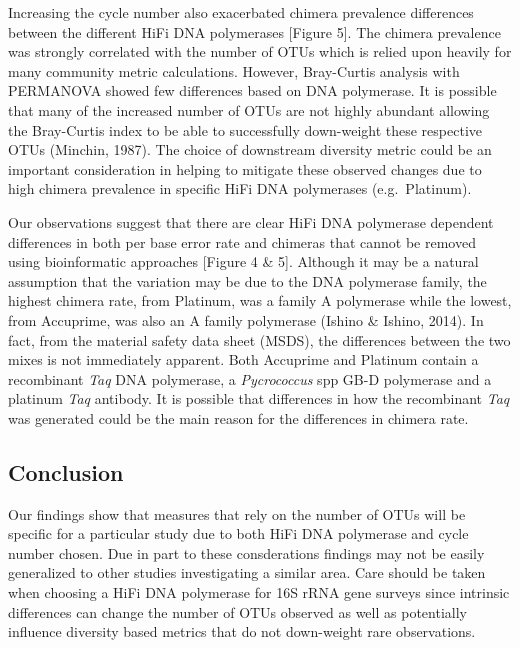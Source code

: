 \documentclass[12pt,]{article}
\begin{document}
Increasing the cycle number also exacerbated chimera prevalence
differences between the different HiFi DNA polymerases {[}Figure 5{]}.
The chimera prevalence was strongly correlated with the number of OTUs
which is relied upon heavily for many community metric calculations.
However, Bray-Curtis analysis with PERMANOVA showed few differences
based on DNA polymerase. It is possible that many of the increased
number of OTUs are not highly abundant allowing the Bray-Curtis index to
be able to successfully down-weight these respective OTUs (Minchin,
1987). The choice of downstream diversity metric could be an important
consideration in helping to mitigate these observed changes due to high
chimera prevalence in specific HiFi DNA polymerases (e.g.~Platinum).

Our observations suggest that there are clear HiFi DNA polymerase
dependent differences in both per base error rate and chimeras that
cannot be removed using bioinformatic approaches {[}Figure 4 \& 5{]}.
Although it may be a natural assumption that the variation may be due to
the DNA polymerase family, the highest chimera rate, from Platinum, was
a family A polymerase while the lowest, from Accuprime, was also an A
family polymerase (Ishino \& Ishino, 2014). In fact, from the material
safety data sheet (MSDS), the differences between the two mixes is not
immediately apparent. Both Accuprime and Platinum contain a recombinant
\emph{Taq} DNA polymerase, a \emph{Pycrococcus} spp GB-D polymerase and
a platinum \emph{Taq} antibody. It is possible that differences in how
the recombinant \emph{Taq} was generated could be the main reason for
the differences in chimera rate.

\newpage

\subsection{Conclusion}\label{conclusion}

Our findings show that measures that rely on the number of OTUs will be
specific for a particular study due to both HiFi DNA polymerase and
cycle number chosen. Due in part to these consderations findings may not
be easily generalized to other studies investigating a similar area.
Care should be taken when choosing a HiFi DNA polymerase for 16S rRNA
gene surveys since intrinsic differences can change the number of OTUs
observed as well as potentially influence diversity based metrics that
do not down-weight rare observations.

\newpage
\end{document}
